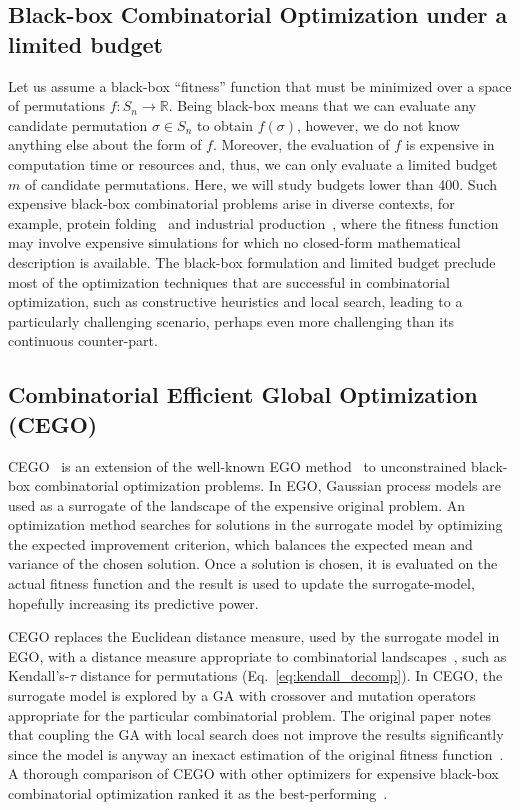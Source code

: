 \documentclass[runningheads]{llncs}
\newcommand{\FEmax}{\ensuremath{m}}
\begin{document}
\subsection{Black-box Combinatorial Optimization under a limited budget}

Let us assume a black-box ``fitness'' function that must be minimized over a
space of permutations $f\colon S_n \to \mathbb{R}$. Being black-box means that
we can evaluate any candidate permutation $\sigma \in S_n$ to obtain
$f(\sigma)$, however, we do not know anything else about the form of
$f$. Moreover, the evaluation of $f$ is expensive in computation time or
resources and, thus, we can only evaluate a limited budget $\FEmax$ of candidate
permutations. Here, we will study budgets lower than 400. Such expensive
black-box combinatorial problems arise in diverse contexts, for example,
protein folding~\citep{RomKraArn2012protein} and industrial
production~\citep{FerAlvDiaIglEna2014ants}, where the fitness function may
involve expensive simulations for which no closed-form mathematical description
is available. The black-box formulation and limited budget preclude most of the
optimization techniques that are successful in combinatorial optimization, such
as constructive  heuristics and local search, leading to
a particularly challenging scenario, perhaps even more challenging than its continuous
counter-part.

\subsection{Combinatorial Efficient Global Optimization (CEGO)}


CEGO~\citep{ZaeStoFriFisNauBar2014} is an extension of the well-known EGO
method~\citep{JonSchWel98go} to unconstrained black-box combinatorial
optimization problems. In EGO, Gaussian process models are used as a surrogate
of the landscape of the expensive original problem. An optimization method
searches for solutions in the surrogate model by optimizing the expected
improvement criterion, which balances the expected mean and variance of the
chosen solution. Once a solution is chosen, it is evaluated on the actual
fitness function and the result is used to update the surrogate-model,
hopefully increasing its predictive power.

CEGO replaces the Euclidean distance measure, used by the surrogate model in
EGO, with a distance measure appropriate to combinatorial
landscapes~\citep{ZaeStoBar2014:ppsn}, such as Kendall's-$\tau$ distance for
permutations (Eq.~\ref{eq:kendall_decomp}). In CEGO, the surrogate model is
explored by a GA with crossover and mutation operators appropriate for the
particular combinatorial problem. The original paper notes that coupling the GA
with local search does not improve the results significantly since the model is
anyway an inexact estimation of the original fitness
function~\citep[p.~875]{ZaeStoFriFisNauBar2014}. A thorough comparison of CEGO
with other optimizers for expensive black-box combinatorial optimization ranked
it as the best-performing~\citep{ZaeStoFriFisNauBar2014}.
\end{document}
